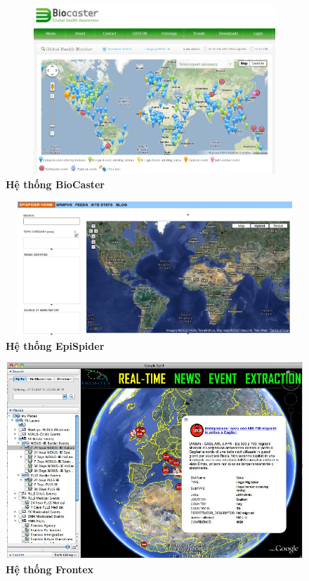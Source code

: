\begin{figure}[htbp]
		\centering
		\includegraphics[width=1\textwidth, height=2.5in]{bio}
		\caption{\textbf{Hệ thống BioCaster}}
		\label{fig:bio}
\end{figure}

\begin{figure}[htbp]
		\centering
		\includegraphics[width=1\textwidth, height=2in]{epi}
		\caption{\textbf{Hệ thống EpiSpider}}
		\label{fig:epi}
\end{figure}


\begin{figure}[htbp]
		\centering
		\includegraphics[width=1\textwidth]{frontex}
		\caption{\textbf{Hệ thống Frontex}}
		\label{fig:frontex}
\end{figure}



